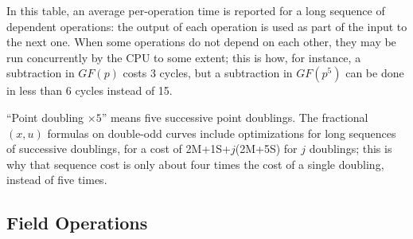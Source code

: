 \documentclass{llncs}
\newcommand{\GF}{GF}
\begin{document}
In this table, an average per-operation time is reported for a long
sequence of dependent operations: the output of each operation is used
as part of the input to the next one. When some operations do not depend
on each other, they may be run concurrently by the CPU to some extent;
this is how, for instance, a subtraction in $\GF(p)$ costs 3 cycles, but
a subtraction in $\GF(p^5)$ can be done in less than 6 cycles instead of
15.

``Point doubling $\times 5$'' means five successive point doublings. The
fractional $(x, u)$ formulas on double-odd curves include optimizations
for long sequences of successive doublings, for a cost of
2M+1S+$j$(2M+5S) for $j$ doublings; this is why that sequence cost
is only about four times the cost of a single doubling, instead of five
times.

\subsection{Field Operations}
\end{document}
